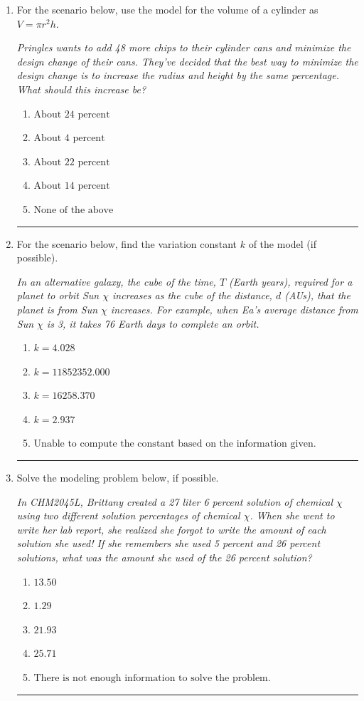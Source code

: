 \documentclass[14pt]{extbook}
\newcommand{\litem}[1]{\item#1\hspace*{-1cm}\rule{\textwidth}{0.4pt}}
\begin{document}
\begin{enumerate}
{\begin{enumerate}[label=\Alph*.]
\end{enumerate} }
\litem{
For the scenario below, use the model for the volume of a cylinder as $V = \pi r^2 h$.
\begin{center}
    \textit{ Pringles wants to add 48 \text{percent} more chips to their cylinder cans and minimize the design change of their cans. They've decided that the best way to minimize the design change is to increase the radius and height by the same percentage. What should this increase be? }
\end{center}
\begin{enumerate}[label=\Alph*.]
\item \( \text{About } 24 \text{ percent} \)
\item \( \text{About } 4 \text{ percent} \)
\item \( \text{About } 22 \text{ percent} \)
\item \( \text{About } 14 \text{ percent} \)
\item \( \text{None of the above} \)

\end{enumerate} }
\litem{
For the scenario below, find the variation constant $k$ of the model (if possible).
\begin{center}
    \textit{ In an alternative galaxy, the cube of the time, $T$ (Earth years), required for a planet to orbit Sun $\chi$ increases as the cube of the distance, $d$ (AUs), that the planet is from Sun $\chi$ increases. For example, when Ea's average distance from Sun $\chi$ is 3, it takes 76 Earth days to complete an orbit. }
\end{center}
\begin{enumerate}[label=\Alph*.]
\item \( k = 4.028 \)
\item \( k = 11852352.000 \)
\item \( k = 16258.370 \)
\item \( k = 2.937 \)
\item \( \text{Unable to compute the constant based on the information given.} \)

\end{enumerate} }
\litem{
Solve the modeling problem below, if possible.
\begin{center}
    \textit{ In CHM2045L, Brittany created a 27 liter 6 percent solution of chemical $\chi$ using two different solution percentages of chemical $\chi$. When she went to write her lab report, she realized she forgot to write the amount of each solution she used! If she remembers she used 5 percent and 26 percent solutions, what was the amount she used of the 26 percent solution? }
\end{center}
\begin{enumerate}[label=\Alph*.]
\item \( 13.50 \)
\item \( 1.29 \)
\item \( 21.93 \)
\item \( 25.71 \)
\item \( \text{There is not enough information to solve the problem.} \)


\end{enumerate}}
\end{enumerate}
\end{document}
